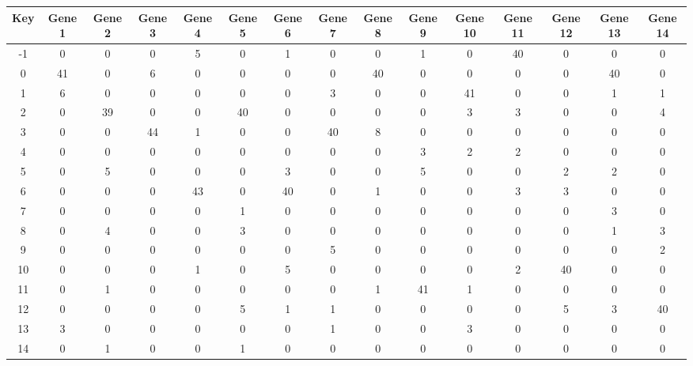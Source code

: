 \begin{tabular}{|c|c|c|c|c|c|c|c|c|c|c|c|c|c|c|}
\hline
Key & Gene 1 & Gene 2 & Gene 3 & Gene 4 & Gene 5 & Gene 6 & Gene 7 & Gene 8 & Gene 9 & Gene 10 & Gene 11 & Gene 12 & Gene 13 & Gene 14 \\
\hline
-1 & 0 & 0 & 0 & 5 & 0 & 1 & 0 & 0 & 1 & 0 & 40 & 0 & 0 & 0 \\
0 & 41 & 0 & 6 & 0 & 0 & 0 & 0 & 40 & 0 & 0 & 0 & 0 & 40 & 0 \\
1 & 6 & 0 & 0 & 0 & 0 & 0 & 3 & 0 & 0 & 41 & 0 & 0 & 1 & 1 \\
2 & 0 & 39 & 0 & 0 & 40 & 0 & 0 & 0 & 0 & 3 & 3 & 0 & 0 & 4 \\
3 & 0 & 0 & 44 & 1 & 0 & 0 & 40 & 8 & 0 & 0 & 0 & 0 & 0 & 0 \\
4 & 0 & 0 & 0 & 0 & 0 & 0 & 0 & 0 & 3 & 2 & 2 & 0 & 0 & 0 \\
5 & 0 & 5 & 0 & 0 & 0 & 3 & 0 & 0 & 5 & 0 & 0 & 2 & 2 & 0 \\
6 & 0 & 0 & 0 & 43 & 0 & 40 & 0 & 1 & 0 & 0 & 3 & 3 & 0 & 0 \\
7 & 0 & 0 & 0 & 0 & 1 & 0 & 0 & 0 & 0 & 0 & 0 & 0 & 3 & 0 \\
8 & 0 & 4 & 0 & 0 & 3 & 0 & 0 & 0 & 0 & 0 & 0 & 0 & 1 & 3 \\
9 & 0 & 0 & 0 & 0 & 0 & 0 & 5 & 0 & 0 & 0 & 0 & 0 & 0 & 2 \\
10 & 0 & 0 & 0 & 1 & 0 & 5 & 0 & 0 & 0 & 0 & 2 & 40 & 0 & 0 \\
11 & 0 & 1 & 0 & 0 & 0 & 0 & 0 & 1 & 41 & 1 & 0 & 0 & 0 & 0 \\
12 & 0 & 0 & 0 & 0 & 5 & 1 & 1 & 0 & 0 & 0 & 0 & 5 & 3 & 40 \\
13 & 3 & 0 & 0 & 0 & 0 & 0 & 1 & 0 & 0 & 3 & 0 & 0 & 0 & 0 \\
14 & 0 & 1 & 0 & 0 & 1 & 0 & 0 & 0 & 0 & 0 & 0 & 0 & 0 & 0 \\
\hline
\end{tabular}